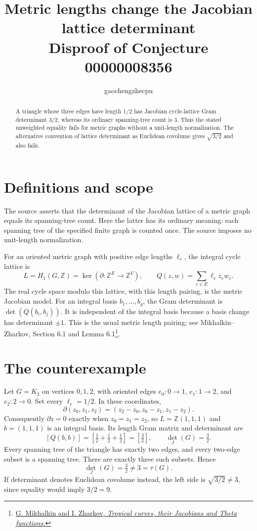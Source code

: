 \documentclass[11pt]{article}
\title{Metric lengths change the Jacobian lattice determinant\\
\large Disproof of Conjecture 00000008356}
\author{gaochengzhecpu}\date{}
\newcommand{\Z}{\mathbb Z}
\begin{document}
\maketitle
\begin{abstract}
A triangle whose three edges have length $1/2$ has Jacobian cycle-lattice
Gram determinant $3/2$, whereas its ordinary spanning-tree count is $3$.
Thus the stated unweighted equality fails for metric graphs without
a unit-length normalization. The alternative convention of lattice
determinant as Euclidean covolume gives $\sqrt{3/2}$ and also fails.
\end{abstract}

\section*{Definitions and scope}
The source asserts that the determinant of the Jacobian lattice of a
metric graph equals its spanning-tree count. Here the latter has its
ordinary meaning: each spanning tree of the specified finite graph
is counted once. The source imposes no unit-length normalization.

For an oriented metric graph with positive edge lengths $\ell_e$, the
integral cycle lattice is
\[
 L=H_1(G,\Z)=\ker(\partial:\Z^{E}\longrightarrow\Z^{V}),
 \qquad Q(z,w)=\sum_{e\in E}\ell_e z_e w_e.
\]
The real cycle space modulo this lattice, with this length pairing,
is the metric Jacobian model. For an integral basis $b_1,\ldots,b_g$,
the Gram determinant is $\det(Q(b_i,b_j))$. It is independent of the
integral basis because a basis change has determinant $\pm1$.
This is the usual metric length pairing; see Mikhalkin--Zharkov,
Section 6.1 and Lemma 6.1\footnote{\href{https://arxiv.org/abs/math/0612267}{G. Mikhalkin and I. Zharkov, \emph{Tropical curves, their Jacobians and Theta functions}.}}.

\section*{The counterexample}
Let $G=K_3$ on vertices $0,1,2$, with oriented edges
$e_0:0\to1$, $e_1:1\to2$, and $e_2:2\to0$. Set every
$\ell_e=1/2$. In these coordinates,
\[
 \partial(z_0,z_1,z_2)=(z_2-z_0,z_0-z_1,z_1-z_2).
\]
Consequently $\partial z=0$ exactly when $z_0=z_1=z_2$, so
$L=\Z(1,1,1)$ and $b=(1,1,1)$ is an integral basis.
Its length Gram matrix and determinant are
\[
 [Q(b,b)]=[\tfrac12+\tfrac12+\tfrac12]=[\tfrac32],
 \qquad \det_J(G)=\tfrac32.
\]
Every spanning tree of the triangle has exactly two edges, and every
two-edge subset is a spanning tree. There are exactly three such
subsets. Hence
\[
 \boxed{\det_J(G)=\tfrac32\ne3=\tau(G).}
\]
If determinant denotes Euclidean covolume instead, the left side is
$\sqrt{3/2}\ne3$, since equality would imply $3/2=9$.
\end{document}
